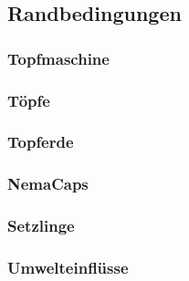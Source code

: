 \subsection{Randbedingungen}

\subsubsection{Topfmaschine}

\subsubsection{Töpfe}

\subsubsection{Topferde}

\subsubsection{NemaCaps}

\subsubsection{Setzlinge}

\subsubsection{Umwelteinflüsse}
